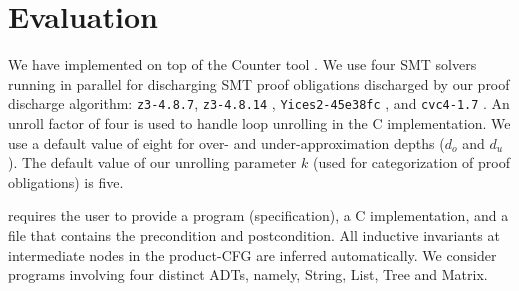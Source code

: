 \section{Evaluation}
\label{sec:syn-eval}

We have implemented \toolName{} on top of the
Counter tool \cite{oopsla20}.
We use four SMT solvers running in parallel for discharging
SMT proof obligations discharged by our proof discharge algorithm:
{\tt z3-4.8.7}, {\tt z3-4.8.14} \cite{z3},
{\tt Yices2-45e38fc} \cite{yices},
and {\tt cvc4-1.7} \cite{cvc4solver}.
An unroll factor of four is used to handle loop unrolling in the C implementation.
We use a default value of eight for
over- and under-approximation depths ($d_o$ and $d_u$).
The default value of
our unrolling parameter $k$ (used for categorization of proof obligations) is five.

\toolName{} requires the user to provide a \SpecL{} program (specification), a C implementation,
and a file that contains the precondition and postcondition. All inductive invariants
at intermediate nodes in the product-CFG are inferred automatically.
We consider programs involving four distinct ADTs, namely,
 String,  List,  Tree
and  Matrix.


